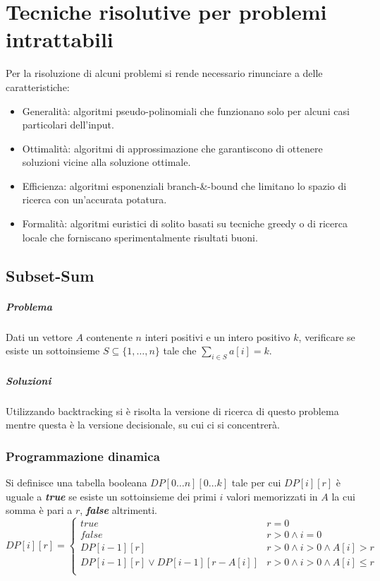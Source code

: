 \chapter{Tecniche risolutive per problemi intrattabili}
Per la risoluzione di alcuni problemi si rende necessario rinunciare a delle caratteristiche:
\begin{itemize}
	\item Generalit\`a: algoritmi pseudo-polinomiali che funzionano solo per alcuni casi particolari dell'input.
	\item Ottimalit\`a: algoritmi di approssimazione che garantiscono di ottenere soluzioni vicine alla soluzione ottimale.
	\item Efficienza: algoritmi esponenziali branch-\&-bound che limitano lo spazio di ricerca con un'accurata potatura.
	\item Formalit\`a: algoritmi euristici di solito basati su tecniche greedy o di ricerca locale che forniscano sperimentalmente risultati buoni.
\end{itemize}
\section{Subset-Sum}
\paragraph{Problema}
Dati un vettore $A$ contenente $n$ interi positivi e un intero positivo $k$, verificare se esiste un sottoinsieme $S\subseteq\{1, \dots, n\}$ tale che $\sum\limits_{i\in S}a[i] = k$.
\paragraph{Soluzioni}
Utilizzando backtracking si \`e risolta la versione di ricerca di questo problema mentre questa \`e la versione decisionale, su cui ci si concentrer\`a. 
\subsection{Programmazione dinamica}
Si definisce una tabella booleana $DP[0\dots n][0\dots k]$ tale per cui $DP[i][r]$ \`e uguale a \emph{\textbf{true}} se esiste un sottoinsieme dei primi $i$ valori memorizzati in $A$
la cui somma \`e pari a $r$, \emph{\textbf{false}} altrimenti.
$$DP[i][r] = 
\begin{cases}
	true \quad\quad\quad & r = 0\\
	false & r > 0 \land i = 0\\
	DP[i - 1][r] & r > 0 \land i > 0 \land A[i] > r\\
	DP[i - 1][r] \lor DP[i - 1][r - A[i]] & r > 0 \land i > 0 \land A[i]\le r\\
\end{cases}$$

